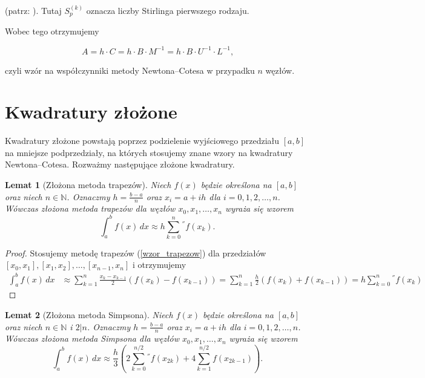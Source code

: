 \documentclass{article}
\newtheorem{lem}{Lemat}[section]
\theoremstyle{definition}
\begin{document}
\noindent (patrz: \cite{nasa}). Tutaj \(S_p^{(k)}\) oznacza liczby Stirlinga pierwszego rodzaju.

\noindent Wobec tego otrzymujemy

\[
    A = h \cdot C = h \cdot B \cdot M^{-1} = h \cdot B \cdot U^{-1} \cdot L^{-1} \text{,}
\]

\noindent czyli wzór na współczynniki metody Newtona--Cotesa w przypadku \(n\) węzłów.



\section{Kwadratury złożone}

Kwadratury złożone powstają poprzez podzielenie wyjściowego przedziału \([a, b]\) na mniejsze podprzedziały, na których stosujemy znane wzory na kwadratury Newtona--Cotesa. Rozważmy następujące złożone kwadratury.

\begin{lem}[Złożona metoda trapezów]
    \label{zlozona_metoda_trapezow}
    Niech \(f(x)\) będzie określona na \([a, b]\) oraz niech \(n \in \mathbb{N}\). Oznaczmy \(h = \frac{b-a}{n}\) oraz \(x_i = a + ih\) dla \(i = 0, 1, 2, \ldots, n\). Wówczas złożona metoda trapezów dla  węzłów \(x_0, x_1, \ldots, x_n\) wyraża się wzorem
    \[
        \int_a^b f(x) \,dx \approx h\sum_{k=0}^{n}{}^{''} f(x_k) \text{.}
    \]
\end{lem}

\begin{proof}
    Stosujemy metodę trapezów (\ref{wzor_trapezow}) dla przedziałów \([x_0, x_1], [x_1, x_2], \ldots, [x_{n-1}, x_n]\) i otrzymujemy
    \begin{align*}
        \int_a^b f(x) \,dx &\approx \sum_{k=1}^{n} \frac{x_k - x_{k-1}}{2}(f(x_k) - f(x_{k-1}))
        = \sum_{k=1}^{n} \frac{h}{2}(f(x_k) + f(x_{k-1})) = h \sum_{k=0}^{n}{}^{''} f(x_k)
    \end{align*}
\end{proof}

\begin{lem}[Złożona metoda Simpsona]
    \label{zlozona_metoda_Simpsona}
     Niech \(f(x)\) będzie określona na \([a, b]\) oraz niech \(n \in \mathbb{N}\) i \(2|n\). Oznaczmy \(h = \frac{b-a}{n}\) oraz \(x_i = a + ih\) dla \(i = 0, 1, 2, \ldots, n\). Wówczas złożona metoda Simpsona dla  węzłów \(x_0, x_1, \ldots, x_n\) wyraża się wzorem
    \[
        \int_a^b f(x) \,dx \approx \frac{h}{3}\left( 2\sum_{k=0}^{n/2}{}^{''} f(x_{2k}) + 4\sum_{k=1}^{n/2} f(x_{2k-1}) \right) \text{.}
    \]
\end{lem}
\end{document}
